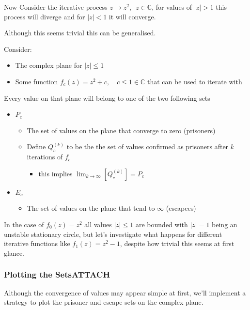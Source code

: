 \documentclass[11pt]{article}
\begin{document}
Now Consider the iterative process \(z \rightarrow z^{2}, \enspace z \in \mathbb{C}\),
for values of \(\left\lvert z \right\rvert >1\) this process will diverge and for \(\left\lvert z \right\rvert <1\) it will converge.

Although this seems trivial this can be generalised.

Consider:

\begin{itemize}
\item The complex plane for \(\left\lvert z \right\rvert \leq 1\)
\item Some function \(f_{c}(z) = z^{2} + c, \quad c \leq 1 \in \mathbb{C}\) that can be used to iterate with
\end{itemize}

Every value on that plane will belong to one of the two following sets

\begin{itemize}
\item \(P_{c}\)
\begin{itemize}
\item The set of values on the plane that converge to zero (prisoners)
\item Define \(Q^{(k)}_{c}\) to be the the set of values confirmed as prisoners after \(k\) iterations of \(f_{c}\)
\begin{itemize}
\item this implies \(\lim_{k \rightarrow \infty} \left[ Q^{(k)}_{c}  \right] = P_{c}\)
\end{itemize}
\end{itemize}
\item \(E_{c}\)
\begin{itemize}
\item The set of values on the plane that tend to \(\infty\) (escapees)
\end{itemize}
\end{itemize}

In the case of \(f_{0}(z) = z^{2}\) all values \(\left\lvert z  \right \rvert \leq 1\) are bounded with \(\left\lvert z  \right \rvert = 1\) being an unstable stationary circle, but let's investigate what happens for different iterative functions like \(f_{1}(z) = z^{2} - 1\), despite how trivial this seems at first glance.

\subsubsection[Plotting the Sets]{Plotting the Sets\hfill{}\textsc{ATTACH}}
\label{sec:orgddc2377}
Although the convergence of values may appear simple at first, we'll implement a
strategy to plot the prisoner and escape sets on the complex plane.
\end{document}
